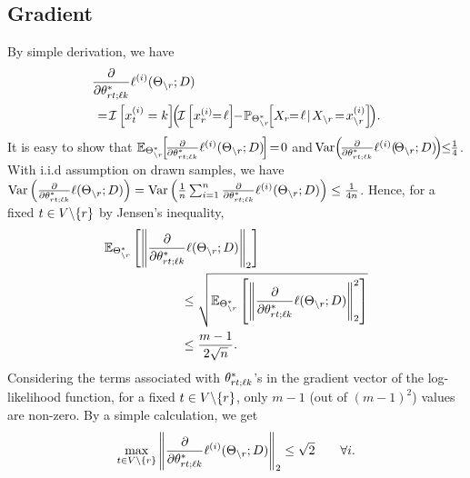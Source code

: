 \subsection{Gradient}
By simple derivation, we have
\begin{equation}
\begin{aligned}
&\frac{\partial}{\partial\theta^*_{\svert t;\ell k}}\ell^{(i)}(\Theta_{\backslash \svert}; \Data) \\ &\,=\! \I\left[x_t^{(i)}=k\right]\!\! \left(\!\I\left[x_\svert^{(i)}\!\!=\!\ell\right]\!\! -\! \mathbb{P}_{\Theta^*_{\backslash\svert}}\!\! \left[X_\svert\!\! =\! \ell \! \mid \! X_{\backslash \svert}\! =\!
x_{\backslash \svert}^{(i)}\right]\!\right)\!.
\end{aligned}
\nonumber
\end{equation}
It is easy to show that $\mathbb{E}_{\Theta^*_{\backslash r}}\!\!\left[\!\frac{\partial}{\partial\theta^*_{rt;\ell k}}\ell^{(i)}(\Theta_{\backslash r}; D)\!\right]\!=\!0$ and $\!\text{Var}\!\left(\!\frac{\partial}{\partial\theta^*_{rt;\ell k}}\ell^{(i)}(\!\Theta_{\backslash \svert}; \Data)\!\right)\!\!\leq\!\!\frac{1}{4}$. With i.i.d assumption on drawn samples, we have $\text{Var}\left(\frac{\partial}{\partial\theta^*_{rt;\ell k}}\ell(\Theta_{\backslash r}; D)\right)=\text{Var}\left(\frac{1}{n}\sum_{i=1}^n\frac{\partial}{\partial\theta^*_{rt;\ell k}}\ell^{(i)}(\Theta_{\backslash r}; D)\right)\leq\frac{1}{4n}$. Hence, for a fixed $t\in V\backslash\{r\}$ by Jensen's inequality,
\begin{equation}
\begin{aligned}
&\mathbb{E}_{\Theta^*_{\backslash r}}\left[\left\|\frac{\partial}{\partial\theta^*_{r t;\ell k}}\ell(\Theta_{\backslash r}; D)\right\|_{2}\right]\\
&\qquad\qquad\qquad\leq\sqrt{\mathbb{E}_{\Theta^*_{\backslash r}}\left[\left\|\frac{\partial}{\partial\theta^*_{r t;\ell k}}\ell(\Theta_{\backslash r}; D)\right\|_{2}^2\right]}\\
&\qquad\qquad\qquad\leq\frac{m-1}{2\sqrt{n}}.
\end{aligned}
\nonumber
\end{equation}
Considering the terms associated with $\theta^*_{r t;\ell k}$'s in the gradient vector of the log-likelihood function, for a fixed $t\in V\backslash\{r\}$, only $m-1$ (out of $(m-1)^2$) values are non-zero. By a simple calculation, we get
\begin{equation}
\max_{t\in V\backslash\{r\}}\left\|\frac{\partial}{\partial\theta^*_{r t;\ell k}}\ell^{(i)}(\Theta_{\backslash r}; D)\right\|_{2}\leq\sqrt{2}\qquad\forall i.\\
\nonumber
\end{equation}
